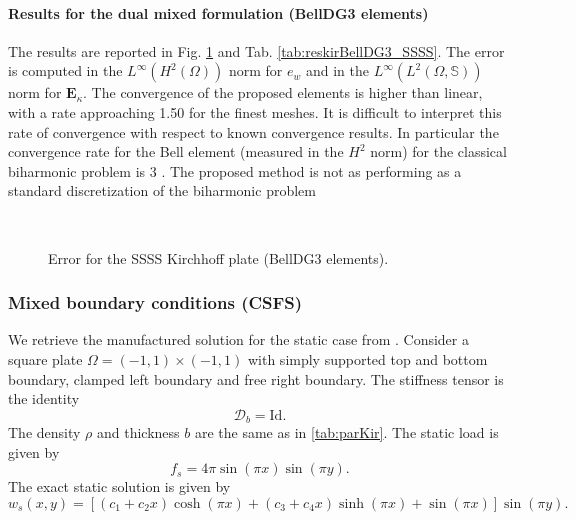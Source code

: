 \paragraph{Results for the dual mixed formulation (BellDG3 elements)}
The results are reported in Fig. \ref{fig:errorBellDG3_SSSS} and Tab. \ref{tab:reskirBellDG3_SSSS}. The error is computed in the $L^\infty (H^2(\Omega))$ norm for $e_w$ and in the $L^\infty (L^2(\Omega, \mathbb{S}))$ norm for $\bm{E}_\kappa$. The convergence of the proposed elements is higher than linear, with a rate approaching 1.50 for the finest meshes. It is difficult to interpret this rate of convergence with respect to known convergence results. In particular the convergence rate for the Bell element (measured in the $H^2$ norm) for the classical biharmonic problem is 3 \cite{ciarlet1988mathematical}. The proposed method is not as performing as a standard discretization of the biharmonic problem


\begin{figure}[htbp]%
	\centering
	\hspace{8pt}%
	 \\
	\caption{Error for the SSSS Kirchhoff plate (BellDG3 elements).}%
	\label{fig:errorBellDG3_SSSS}%
\end{figure}


\subsubsection{Mixed boundary conditions (CSFS)}

We retrieve the manufactured solution for the static case from \cite{rafetseder2018siam}. Consider a square plate $\Omega = (-1,1)\times (-1,1)$ with simply supported top and  bottom boundary, clamped left boundary and free right boundary. The stiffness tensor is the identity
\begin{equation*}
\bm{\mathcal{D}}_b = \mathrm{Id}.
\end{equation*} 
The density $\rho$ and thickness $b$ are the same as in \ref{tab:parKir}.
The static load is given by
\begin{equation*}
f_s = 4 \pi \sin(\pi x) \sin(\pi y).
\end{equation*}
The exact static solution is given by
\begin{equation*}
w_s(x, y) = [(c_1 + c_2 x) \cosh(\pi x) + (c_3 + c_4 x) \sinh(\pi x) + \sin(\pi x)] \sin(\pi y).
\end{equation*}

